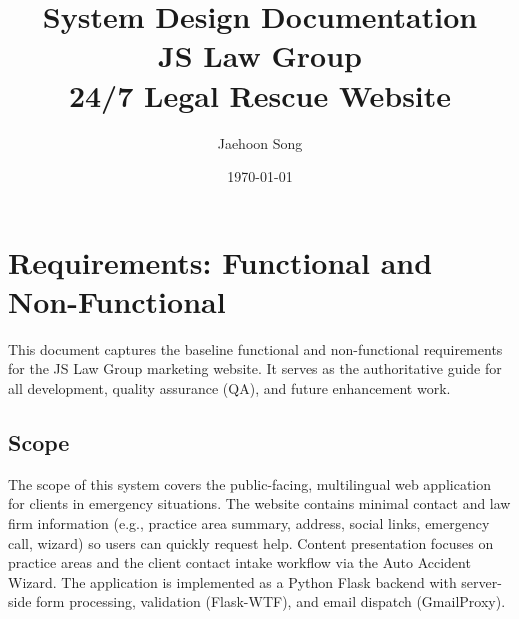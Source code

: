 \documentclass{article}
\title{System Design Documentation \\ \vspace*{20pt} \large JS Law Group \\ \vspace*{20pt} 24/7 Legal Rescue Website}
\author{Jaehoon Song}
\date{\today}
\begin{document}
\maketitle

\tableofcontents












\newpage
\section{Requirements: Functional and Non-Functional}\label{sec:requirements}
This document captures the baseline functional and non-functional 
requirements for the JS Law Group marketing website. It serves as the 
authoritative guide for all development, quality assurance (QA), 
and future enhancement work.
\subsection{Scope}
The scope of this system covers the public-facing, multilingual web 
application for clients in emergency situations. The website contains 
minimal contact and law firm information (e.g., practice area summary, 
address, social links, emergency call, wizard) so users can quickly 
request help. Content presentation focuses on practice areas and the 
client contact intake workflow via the Auto Accident Wizard. The 
application is implemented as a Python Flask backend with server-side 
form processing, validation (Flask-WTF), and email dispatch (GmailProxy).
\end{document}
